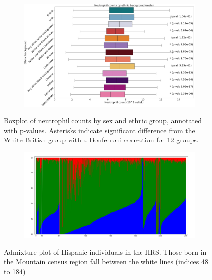 \documentclass[12pt]{pnas-new}
\begin{document}
\begin{figure}
    \centering
    \begin{subfigure}{\textwidth}
    \includegraphics[width=\textwidth]{images/male_neutrophil_boxplot_annotated.pdf}
    \end{subfigure}
    \caption{Boxplot of neutrophil counts by sex and ethnic group, annotated with p-values. Asterisks indicate significant difference from the White British group with a Bonferroni correction for 12 groups.}
    \label{fig:supp_box_neutrophill_m}
\end{figure}


\begin{figure}
    \centering
    \begin{subfigure}{\textwidth}
    \includegraphics[width=\textwidth]{images/admixture_plot_highlight_mountain_copy.pdf}
    \end{subfigure}
    \caption{Admixture plot of Hispanic individuals in the HRS. Those born in the Mountain census region fall between the white lines (indices 48 to 184)}
    \label{fig:supp_hrs_hisp_admix}
\end{figure}
\end{document}
